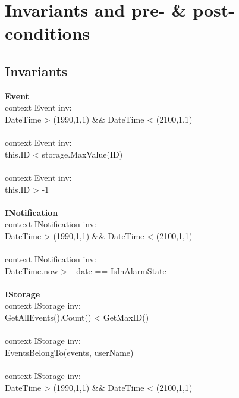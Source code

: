 \section{Invariants and pre- \& post-conditions}
\subsection{Invariants}
\textbf{Event\\}
context Event inv:\\
DateTime > (1990,1,1) \&\& DateTime < (2100,1,1)\\\\
context Event inv:\\
this.ID < storage.MaxValue(ID)\\\\
context Event inv:\\
this.ID > -1\\\\
\textbf{INotification\\}
context INotification inv:\\
DateTime > (1990,1,1) \&\& DateTime < (2100,1,1)\\\\
context INotification inv:\\
DateTime.now > _date == IsInAlarmState\\\\
\textbf{IStorage\\}
context IStorage inv:\\
GetAllEvents().Count() < GetMaxID()\\\\
context IStorage inv:\\
EventsBelongTo(events, userName)\\\\
context IStorage inv:\\
DateTime > (1990,1,1) \&\& DateTime < (2100,1,1)

